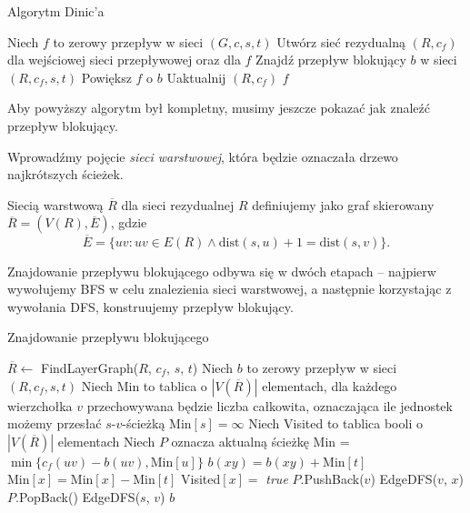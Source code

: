 \begin{algorithm}[H]
	\caption{Algorytm Dinic'a}
	\begin{algorithmic}[1]
		\State Niech $f$ to zerowy przepływ w sieci $(G,c,s,t)$
		\State Utwórz sieć rezydualną $(R, c_f)$ dla wejściowej 
		sieci przepływowej oraz dla $f$ 
		\State Znajdź przepływ blokujący $b$ w sieci $(R, c_f, s, t)$
		\State Powiększ $f$ o $b$
		\State Uaktualnij $(R, c_f)$
		\EndWhile
		\State \Return $f$
		\EndProcedure
	\end{algorithmic}
	\label{dinic_alg}
\end{algorithm}

Aby powyższy algorytm był kompletny, musimy jeszcze pokazać jak znaleźć przepływ blokujący.

Wprowadźmy pojęcie \textit{sieci warstwowej}, która będzie
oznaczała drzewo najkrótszych ścieżek.
\begin{defi}
	Siecią warstwową $\overline{R}$ dla sieci rezydualnej $R$
	definiujemy jako graf skierowany $\overline{R} = (V(R), \overline{E})$, gdzie
	\[\overline{E}=\{uv : uv \in E(R) \land \text{dist}(s, u)  + 1 = \text{dist}(s, v)\}.\]
\end{defi}

Znajdowanie przepływu blokującego odbywa się w dwóch etapach -- najpierw
wywołujemy BFS w celu znalezienia sieci warstwowej,
a następnie korzystając z wywołania DFS, konstruujemy
przepływ blokujący.

\begin{algorithm}[H]
	\caption{Znajdowanie przepływu blokującego}
	\begin{algorithmic}[1]
		\State $\overline{R} \gets$ FindLayerGraph($R$, $c_f$, $s$, $t$)
		\State Niech $b$ to zerowy przepływ w sieci $(R, c_f, s, t)$
		\State Niech Min to tablica o $|V(\overline{R})|$ elementach, 
		dla każdego wierzchołka $v$ przechowywana będzie liczba całkowita,
		oznaczająca ile jednostek możemy przesłać $s$-$v$-ścieżką 
		\State Min$[s] = \infty$
		\State Niech Visited to tablica booli o $|V(\overline{R})|$ elementach
		\State Niech $P$ oznacza aktualną ścieżkę
		\State Min = $\min\{c_f(uv) - b(uv), \text{Min}[u]\}$
		\State $b(xy) = b(xy) + \text{Min}[t]$
		\State $\text{Min}[x] = \text{Min}[x] - \text{Min}[t]$
		\EndFor
		\EndIf
		\State Visited$[x]=$ \textit{true} 
		\State $P$.PushBack($v$)
		\State EdgeDFS($v$, $x$)
		\State $P$.PopBack()
		\EndIf
		\EndFor
		\EndProcedure
		\State EdgeDFS($s$, $v$)
		\EndFor
		\State \Return $b$
		\EndProcedure
	\end{algorithmic}
	\label{layer_graph_alg}
\end{algorithm}

